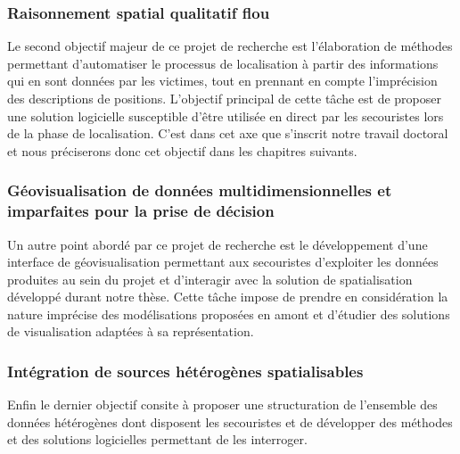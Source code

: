 \subsubsection{Raisonnement spatial qualitatif flou}

Le second objectif majeur de ce projet de recherche est l’élaboration
de méthodes permettant d'automatiser le processus de localisation à
partir des informations qui en sont données par les victimes, tout en
prennant en compte l'imprécision des descriptions de
positions. L'objectif principal de cette tâche est de proposer une
solution logicielle susceptible d'être utilisée en direct par les
secouristes lors de la phase de localisation. C'est dans cet axe que
s'inscrit notre travail doctoral et nous préciserons donc cet objectif
dans les chapitres suivants.

\subsubsection{Géovisualisation de données multidimensionnelles et
  imparfaites pour la prise de décision}

Un autre point abordé par ce projet de recherche est le développement
d'une interface de géovisualisation permettant aux secouristes
d'exploiter les données produites au sein du projet et d'interagir
avec la solution de spatialisation développé durant notre thèse. Cette
tâche impose de prendre en considération la nature imprécise des
modélisations proposées en amont et d'étudier des solutions de
visualisation adaptées à sa représentation.

\subsubsection{Intégration de sources hétérogènes spatialisables}

Enfin le dernier objectif consite à proposer une structuration de
l'ensemble des données hétérogènes dont disposent les secouristes et
de développer des méthodes et des solutions logicielles permettant de
les interroger.


